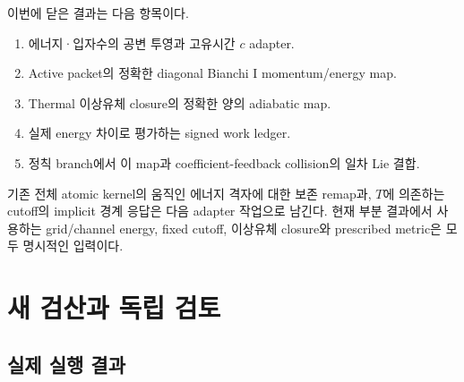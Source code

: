 \documentclass[11pt,a4paper]{article}
\providecommand{\tightlist}{\setlength{\itemsep}{2pt}\setlength{\parskip}{0pt}}
\begin{document}
이번에 닫은 결과는 다음 항목이다.

\begin{enumerate}
\def\labelenumi{\arabic{enumi}.}
\tightlist
\item
  에너지·입자수의 공변 투영과 고유시간 \(c\) adapter.
\item
  Active packet의 정확한 diagonal Bianchi I momentum/energy map.
\item
  Thermal 이상유체 closure의 정확한 양의 adiabatic map.
\item
  실제 energy 차이로 평가하는 signed work ledger.
\item
  정칙 branch에서 이 map과 coefficient-feedback collision의 일차 Lie 결합.
\end{enumerate}

기존 전체 atomic kernel의 움직인 에너지 격자에 대한 보존 remap과, \(T\)에 의존하는 cutoff의 implicit 경계 응답은 다음 adapter 작업으로 남긴다. 현재 부분 결과에서 사용하는 grid/channel energy, fixed cutoff, 이상유체 closure와 prescribed metric은 모두 명시적인 입력이다.

\hypertarget{uxc0c8-uxac80uxc0b0uxacfc-uxb3c5uxb9bd-uxac80uxd1a0}{%
\section{새 검산과 독립 검토}\label{uxc0c8-uxac80uxc0b0uxacfc-uxb3c5uxb9bd-uxac80uxd1a0}}

\hypertarget{uxc2e4uxc81c-uxc2e4uxd589-uxacb0uxacfc}{%
\subsection{실제 실행 결과}\label{uxc2e4uxc81c-uxc2e4uxd589-uxacb0uxacfc}}
\end{document}
